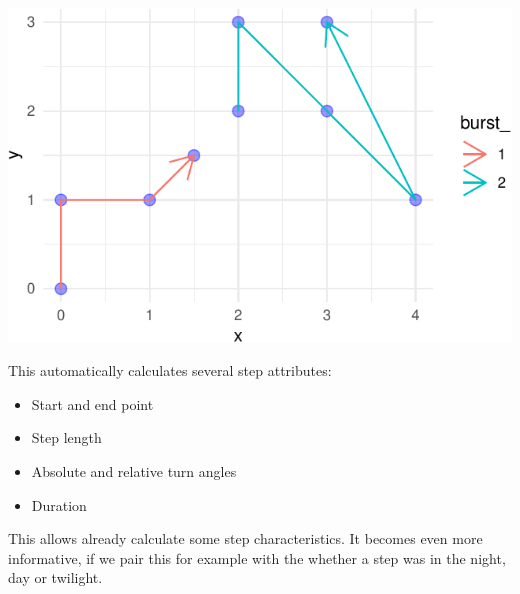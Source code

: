 \documentclass[ignorenonframetext,,t]{beamer}
\providecommand{\tightlist}{%
\setlength{\itemsep}{0pt}\setlength{\parskip}{0pt}}
\providecommand{\tightlist}{%
\setlength{\itemsep}{0pt}\setlength{\parskip}{0pt}}
\renewcommand{\tightlist}{\setlength{\itemsep}{1.4ex}\setlength{\parskip}{0pt}}
\begin{document}
\begin{frame}
\begin{center}\includegraphics[width=0.85\linewidth]{01a_lecture_files/figure-beamer/unnamed-chunk-16-1} \end{center}
\end{frame}

\begin{frame}
This automatically calculates several step attributes:

\begin{itemize}
\tightlist
\item
  Start and end point
\item
  Step length
\item
  Absolute and relative turn angles
\item
  Duration
\end{itemize}

This allows already calculate some step characteristics. It becomes even
more informative, if we pair this for example with the whether a step
was in the night, day or twilight.
\end{frame}

\end{document}
